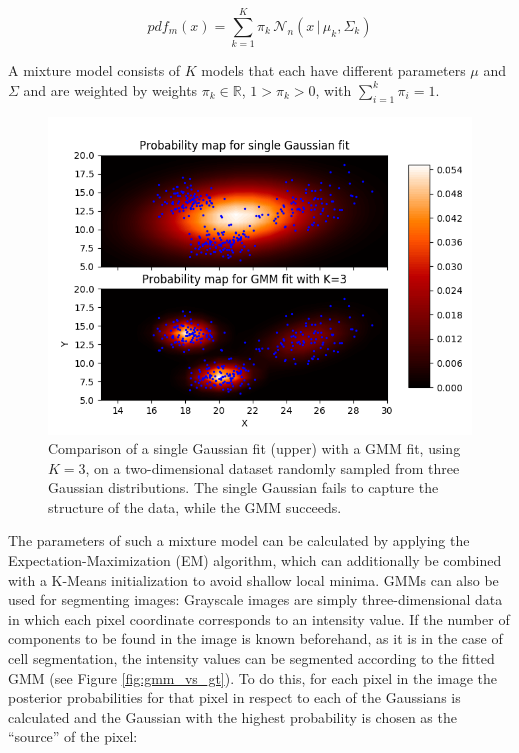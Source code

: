 \[ pdf_m (x) = \sum \limits_{k=1}^{K} \pi_k \, \mathcal{N}_n (x\,|\, \mu_k, \Sigma_k) \]

\noindent A mixture model consists of $K$ models that each have different parameters $\mu$ and $\Sigma$ and are weighted by weights $\pi_k \in \mathbb{R}$, $1 > \pi_k > 0$, with $\sum_{i=1}^{k} \pi_i = 1$.

\begin {figure}[!ht]
	\includegraphics{img/fig_normal_vs_gmm}
	\caption{Comparison of a single Gaussian fit (upper) with a GMM fit, using $K=3$, on a two-dimensional dataset randomly sampled from three Gaussian distributions. The single Gaussian fails to capture the structure of the data, while the GMM succeeds.}
	\label{fig:normal_vs_gmm}
\end {figure}

\noindent The parameters of such a mixture model can be calculated by applying the Expectation-Maximization (EM) algorithm, which can additionally be combined with a K-Means initialization to avoid shallow local minima.\cite{em_algorithm} GMMs can also be used for segmenting images: Grayscale images are simply three-dimensional data in which each pixel coordinate corresponds to an intensity value. If the number of components to be found in the image is known beforehand, as it is in the case of cell segmentation, the intensity values can be segmented according to the fitted GMM (see Figure \ref{fig:gmm_vs_gt}). To do this, for each pixel in the image the posterior probabilities for that pixel in respect to each of the Gaussians is calculated and the Gaussian with the highest probability is chosen as the ``source'' of the pixel:

